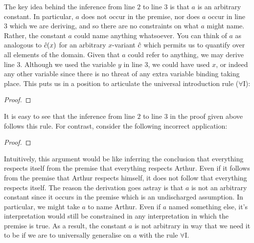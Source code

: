 The key idea behind the inference from line $2$ to line $3$ is that $a$ is an arbitrary constant. 
In particular, $a$ does not occur in the premise, nor does $a$ occur in line $3$ which we are deriving, and so there are no constraints on what $a$ might name. 
Rather, the constant $a$ could name anything whatsoever. 
You can think of $a$ as analogous to $\hat{c}(x)$ for an arbitrary $x$-variant $\hat{c}$ which permits us to quantify over all elements of the domain.
Given that $a$ could refer to anything, we may derive line $3$.
Although we used the variable $y$ in line $3$, we could have used $x$, or indeed any other variable since there is no threat of any extra variable binding taking place.
This puts us in a position to articulate the universal introduction rule ($\forall$I):

\begin{proof}
     
   
\end{proof}

It is easy to see that the inference from line $2$ to line $3$ in the proof given above follows this rule.
For contrast, consider the following incorrect application:

\begin{proof}
	 \pr{}
	 
   
\end{proof}

Intuitively, this argument would be like inferring the conclusion that everything respects itself from the premise that everything respects Arthur.
Even if it follows from the premise that Arthur respects himself, it does not follow that everything respects itself.
The reason the derivation goes astray is that $a$ is not an arbitrary constant since it occurs in the premise which is an undischarged assumption.
In particular, we might take $a$ to name Arthur.
Even if $a$ named something else, it's interpretation would still be constrained in any interpretation in which the premise is true.
As a result, the constant $a$ is not arbitrary in way that we need it to be if we are to universally generalise on $a$ with the rule $\forall$I. 

